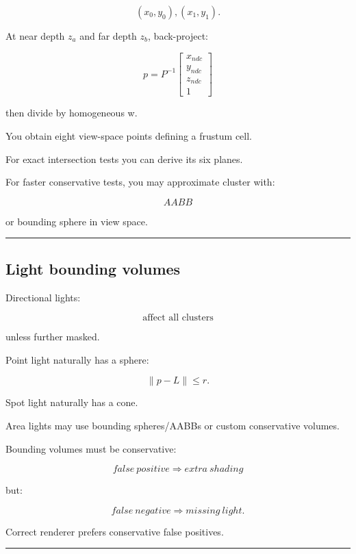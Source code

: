 \[
(x_0,y_0),(x_1,y_1).
\]

At near depth \(z_a\) and far depth \(z_b\), back-project:

\[
p=
P^{-1}
\begin{bmatrix}
x_{ndc}\\
y_{ndc}\\
z_{ndc}\\
1
\end{bmatrix}
\]

then divide by homogeneous w.

You obtain eight view-space points defining a frustum cell.

For exact intersection tests you can derive its six planes.

For faster conservative tests, you may approximate cluster with:

\[
AABB
\]

or bounding sphere in view space.

\begin{center}\rule{0.5\linewidth}{0.5pt}\end{center}

\subsection{Light bounding volumes}\label{04-visual-computing-ii-ch040-light-bounding-volumes}

\hypertarget{04-visual-computing-ii-ch040-light-bounding-volumes}{}

Directional lights:

\[
\boxed{\text{affect all clusters}}
\]

unless further masked.

Point light naturally has a sphere:

\[
\|p-L\|\le r.
\]

Spot light naturally has a cone.

Area lights may use bounding spheres/AABBs or custom conservative volumes.

Bounding volumes must be conservative:

\[
\boxed{
false\ positive
\Rightarrow
extra\ shading
}
\]

but:

\[
\boxed{
false\ negative
\Rightarrow
missing\ light.
}
\]

Correct renderer prefers conservative false positives.

\begin{center}\rule{0.5\linewidth}{0.5pt}\end{center}

